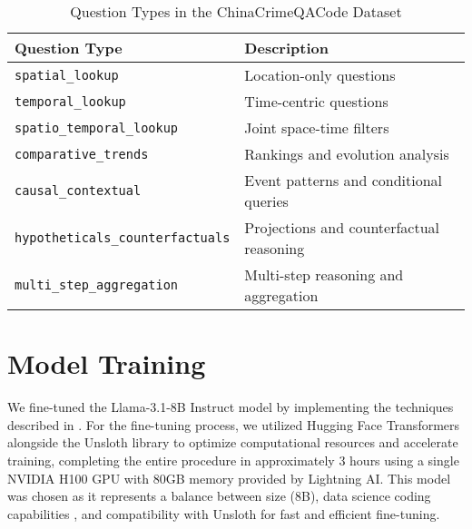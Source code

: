\begin{table}[hbtp]
\centering
\caption{Question Types in the ChinaCrimeQACode Dataset}
\label{tab:question_types}
\begin{tabular}{ll}
\toprule
\textbf{Question Type} & \textbf{Description} \\
\midrule
\texttt{spatial\_lookup} & Location-only questions \\
\texttt{temporal\_lookup} & Time-centric questions \\
\texttt{spatio\_temporal\_lookup} & Joint space-time filters \\
\texttt{comparative\_trends} & Rankings and evolution analysis \\
\texttt{causal\_contextual} & Event patterns and conditional queries \\
\texttt{hypotheticals\_counterfactuals} & Projections and counterfactual reasoning \\
\texttt{multi\_step\_aggregation} & Multi-step reasoning and aggregation \\
\bottomrule
\end{tabular}
\end{table}


\section{Model Training}

We fine-tuned the Llama-3.1-8B Instruct model \cite{Grattafiori2024Llama3, Unsloth2024WhatModel} by implementing the techniques described in \cite{Pareja2024RecipesSFT}. For the fine-tuning process, we utilized Hugging Face Transformers alongside the Unsloth library to optimize computational resources and accelerate training, completing the entire procedure in approximately 3 hours using a single NVIDIA H100 GPU with 80GB memory provided by Lightning AI. This model was chosen as it represents a balance between size (8B), data science coding capabilities \cite{Lai2022DS1000}, and compatibility with Unsloth for fast and efficient fine-tuning.

